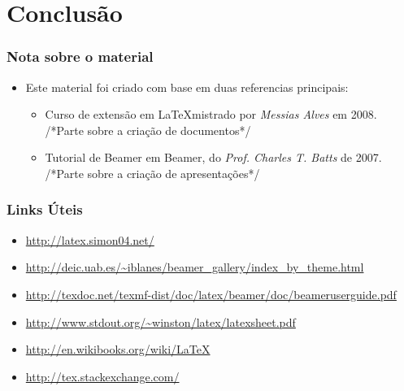 \section{Conclusão}

\begin{frame}
\frametitle{Nota sobre o material} 

\begin{itemize}
  \item Este material foi criado com base em duas referencias principais:
  \begin{itemize}
		\item Curso de extensão em \LaTeX mistrado por \textit{Messias Alves} em 2008.
    {\color{darkcerulean} /*Parte sobre a criação de documentos*/}
		\item Tutorial de Beamer em Beamer, do \textit{Prof. Charles T. Batts} de
		2007. {\color{darkcerulean} /*Parte sobre a criação de apresentações*/}
  \end{itemize}
\end{itemize}
\end{frame}


\begin{frame}
\frametitle{Links Úteis} 

\begin{itemize}
  \item \url{http://latex.simon04.net/}
  \item \url{http://deic.uab.es/~iblanes/beamer_gallery/index_by_theme.html}
  \item \url{http://texdoc.net/texmf-dist/doc/latex/beamer/doc/beameruserguide.pdf}
  \item \url{http://www.stdout.org/~winston/latex/latexsheet.pdf}
  \item \url{http://en.wikibooks.org/wiki/LaTeX}
  \item {\Large \color{darkcerulean} \url{http://tex.stackexchange.com/}}
\end{itemize}
\end{frame}



